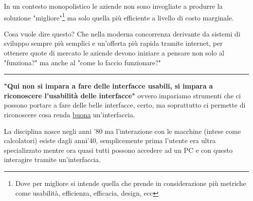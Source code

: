 \documentclass[11pt,a4paper]{book}
\begin{document}
In un contesto monopolistico le aziende non sono invogliate a produrre la soluzione "migliore"\footnote{Dove per migliore si intende quella che prende in considerazione più metriche come usabilità, efficienza, efficacia, design, ecc} ma solo quella più efficiente a livello di costo marginale.   

Cosa vuole dire questo? Che nella moderna concorrenza derivante da sistemi di sviluppo sempre più semplici e un'offerta più rapida tramite internet, per ottenere quote di mercato le aziende devono iniziare a pensare non solo al "funziona?" ma anche al "come lo faccio funzionare?"
\\\noindent\rule{\textwidth}{1pt}

\textbf{"Qui non si impara a fare delle interfacce usabili, si impara a riconoscere l'usabilità delle interfacce"} ovvero impariamo strumenti che ci possono portare a fare delle belle interfacce, certo, ma soprattutto ci permette di riconoscere cosa renda \underline{buona} un'interfaccia.

La disciplina nasce negli anni '80 ma l'interazione con le macchine (intese come calcolatori) esiste dagli anni'40, semplicemente prima l'utente era ultra specializzato mentre ora quasi tutti possono accedere ad un PC e con questo interagire tramite un'interfaccia.
\end{document}
